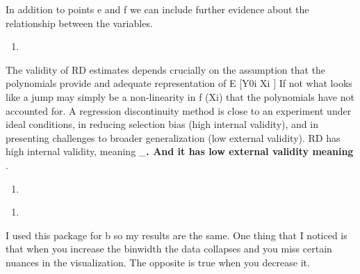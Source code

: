 \documentclass[
  12pt,
  landscape]{article}
\begin{document}
In addition to points e and f we can include further evidence about the
relationship between the variables.

\begin{enumerate}
\def\labelenumi{(\alph{enumi})}
\setcounter{enumi}{7}
\item
\end{enumerate}

The validity of RD estimates depends crucially on the assumption that
the polynomials provide and adequate representation of E {[}Y0i
\textbar{} Xi {]} If not what looks like a jump may simply be a
non-linearity in f (Xi) that the polynomials have not accounted for. A
regression discontinuity method is close to an experiment under ideal
conditions, in reducing selection bias (high internal validity), and in
presenting challenges to broader generalization (low external validity).
RD has high internal validity, meaning \_\textbf{. And it has low
external validity meaning }.

\begin{enumerate}
\def\labelenumi{(\roman{enumi})}
\item
\end{enumerate}

\begin{enumerate}
\def\labelenumi{(\alph{enumi})}
\setcounter{enumi}{9}
\item
\end{enumerate}

I used this package for b so my results are the same. One thing that I
noticed is that when you increase the binwidth the data collapses and
you miss certain nuances in the visualization. The opposite is true when
you decrease it.
\end{document}
